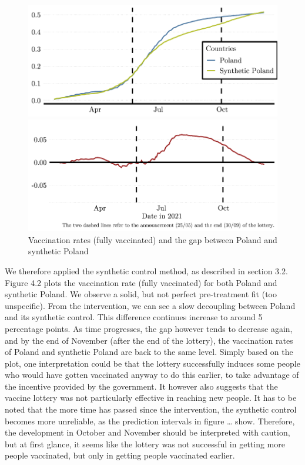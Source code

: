 \documentclass{scrbook}
\begin{document}
\begin{figure}[h]
\caption{Vaccination rates (fully vaccinated) and the gap between Poland and synthetic Poland}

\begin{center}\includegraphics{bachelor_thesis_files/figure-latex/unnamed-chunk-3-1} \end{center}



\begin{center}\includegraphics{bachelor_thesis_files/figure-latex/unnamed-chunk-3-2} \end{center}
\end{figure}

We therefore applied the synthetic control method, as described in
section 3.2. Figure 4.2 plots the vaccination rate (fully vaccinated)
for both Poland and synthetic Poland. We observe a solid, but not
perfect pre-treatment fit (too unspecific). From the intervention, we
can see a slow decoupling between Poland and its synthetic control. This
difference continues increase to around 5 percentage points. As time
progresses, the gap however tends to decrease again, and by the end of
November (after the end of the lottery), the vaccination rates of Poland
and synthetic Poland are back to the same level. Simply based on the
plot, one interpretation could be that the lottery successfully induces
some people who would have gotten vaccinated anyway to do this earlier,
to take advantage of the incentive provided by the government. It
however also suggests that the vaccine lottery was not particularly
effective in reaching new people. It has to be noted that the more time
has passed since the intervention, the synthetic control becomes more
unreliable, as the prediction intervals in figure \ldots{} show.
Therefore, the development in October and November should be interpreted
with caution, but at first glance, it seems like the lottery was not
successful in getting more people vaccinated, but only in getting people
vaccinated earlier.
\end{document}
